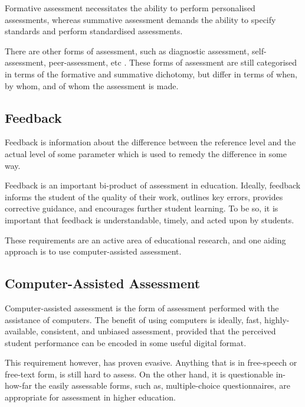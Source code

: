 Formative assessment necessitates the ability to perform personalised
assessments, whereas summative assessment demands the ability to specify
standards and perform standardised assessments.

There are other forms of assessment, such as diagnostic assessment,
self-assessment, peer-assessment, etc \cite{bull-mckenna-2004,topping-1998}.
These forms of assessment are still categorised in terms of the formative and
summative dichotomy, but differ in terms of when, by whom, and of whom the
assessment is made.

\subsection{Feedback}

Feedback is information about the difference between the reference level and
the actual level of some parameter which is used to remedy the difference in
some way\cite{ramaprasad1989}.

Feedback is an important bi-product of assessment in
education\cite{black-william-1998}. Ideally, feedback informs the student of
the quality of their work, outlines key errors, provides corrective guidance,
and encourages further student learning. To be so, it is important that
feedback is understandable, timely, and acted upon by
students\cite{gibbs-simpson-2004}.

These requirements are an active area of educational research, and one aiding
approach is to use computer-assisted assessment.

\subsection{Computer-Assisted Assessment}

Computer-assisted assessment is the form of assessment performed with the
assistance of computers\cite{conole-warburton-2005}. The benefit of using
computers is ideally, fast, highly-available, consistent, and unbiased
assessment\cite{ala-mutka-2005}, provided that the perceived student
performance can be encoded in some useful digital format.

This requirement however, has proven evasive. Anything that is in free-speech
or free-text form, is still hard to assess\cite{valenti-et-al-2003}. On the
other hand, it is questionable in-how-far the easily assessable forms, such as,
multiple-choice questionnaires, are appropriate for assessment in higher
education\cite{conole-warburton-2005}.

